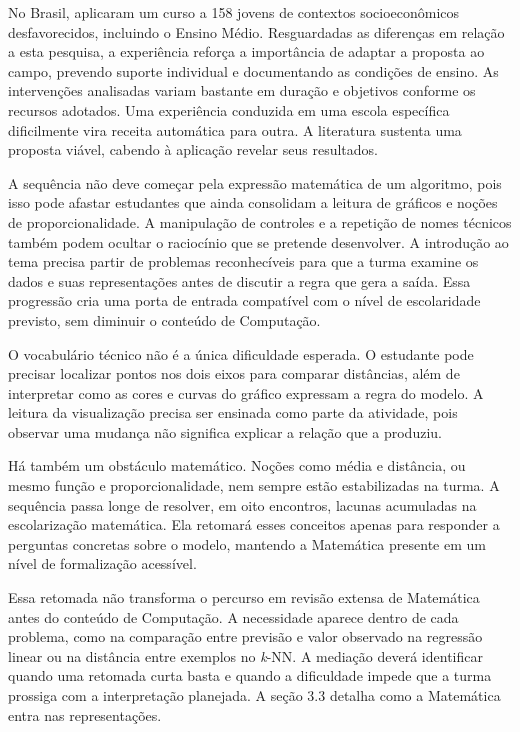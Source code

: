 No Brasil,  aplicaram um curso a 158 jovens de contextos socioeconômicos desfavorecidos, incluindo o Ensino Médio. Resguardadas as diferenças em relação a esta pesquisa, a experiência reforça a importância de adaptar a proposta ao campo, prevendo suporte individual e documentando as condições de ensino. As intervenções analisadas variam bastante em duração e objetivos conforme os recursos adotados. Uma experiência conduzida em uma escola específica dificilmente vira receita automática para outra. A literatura sustenta uma proposta viável, cabendo à aplicação revelar seus resultados.

A sequência não deve começar pela expressão matemática de um algoritmo, pois isso pode afastar estudantes que ainda consolidam a leitura de gráficos e noções de proporcionalidade. A manipulação de controles e a repetição de nomes técnicos também podem ocultar o raciocínio que se pretende desenvolver. A introdução ao tema precisa partir de problemas reconhecíveis para que a turma examine os dados e suas representações antes de discutir a regra que gera a saída. Essa progressão cria uma porta de entrada compatível com o nível de escolaridade previsto, sem diminuir o conteúdo de Computação.

O vocabulário técnico não é a única dificuldade esperada. O estudante pode precisar localizar pontos nos dois eixos para comparar distâncias, além de interpretar como as cores e curvas do gráfico expressam a regra do modelo. A leitura da visualização precisa ser ensinada como parte da atividade, pois observar uma mudança não significa explicar a relação que a produziu.

Há também um obstáculo matemático. Noções como média e distância, ou mesmo função e proporcionalidade, nem sempre estão estabilizadas na turma. A sequência passa longe de resolver, em oito encontros, lacunas acumuladas na escolarização matemática. Ela retomará esses conceitos apenas para responder a perguntas concretas sobre o modelo, mantendo a Matemática presente em um nível de formalização acessível.

Essa retomada não transforma o percurso em revisão extensa de Matemática antes do conteúdo de Computação. A necessidade aparece dentro de cada problema, como na comparação entre previsão e valor observado na regressão linear ou na distância entre exemplos no \textit{k}-NN. A mediação deverá identificar quando uma retomada curta basta e quando a dificuldade impede que a turma prossiga com a interpretação planejada. A seção 3.3 detalha como a Matemática entra nas representações.

